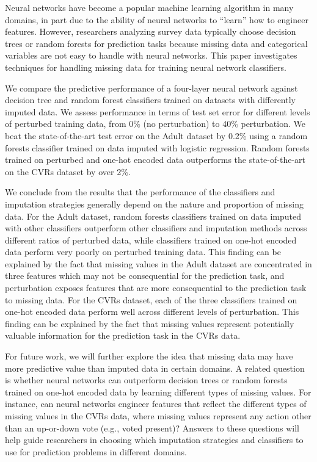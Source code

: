 \documentclass[10pt,twocolumn,letterpaper]{article}
\begin{document}
Neural networks have become a popular machine learning algorithm in many domains, in part due to the ability of neural networks to ``learn'' how to engineer features.  However, researchers analyzing survey data typically choose decision trees or random forests for prediction tasks because missing data and categorical variables are not easy to handle with neural networks. This paper investigates techniques for handling missing data for training neural network classifiers. 

We compare the predictive performance of a four-layer neural network against decision tree and random forest classifiers trained on datasets with differently imputed data. We assess performance in terms of test set error for different levels of perturbed training data, from 0\% (no perturbation) to 40\% perturbation. We beat the state-of-the-art test error on the Adult dataset by 0.2\% using a random forests classifier trained on data imputed with logistic regression. Random forests trained on perturbed and one-hot encoded data outperforms the state-of-the-art on the CVRs dataset by over 2\%. 

We conclude from the results that the performance of the classifiers and imputation strategies generally depend on the nature and proportion of missing data. For the Adult dataset, random forests classifiers trained on data imputed with other classifiers outperform other classifiers and imputation methods across different ratios of perturbed data, while classifiers trained on one-hot encoded data perform very poorly on perturbed training data. This finding can be explained by the fact that missing values in the Adult dataset are concentrated in three features which may not be consequential for the prediction task, and perturbation exposes features that are more consequential to the prediction task to missing data. For the CVRs dataset, each of the three classifiers trained on one-hot encoded data perform well across different levels of perturbation. This finding can be explained by the fact that missing values represent potentially valuable information for the prediction task in the CVRs data.

For future work, we will further explore the idea that missing data may have more predictive value than imputed data in certain domains. A related question is whether neural networks can outperform decision trees or random forests trained on one-hot encoded data by learning different types of missing values. For instance, can neural networks engineer features that reflect the different types of missing values in the CVRs data, where missing values represent any action other than an up-or-down vote (e.g., voted present)? Answers to these questions will help guide researchers in choosing which imputation strategies and classifiers to use for prediction problems in different domains. 


{\small


}
\end{document}
